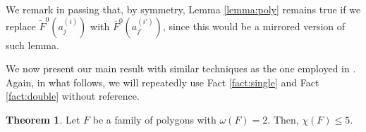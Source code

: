\documentclass[12pt]{article}
\theoremstyle{definition}
\newtheorem{thm}{Theorem}
\begin{document}
     We remark in passing that, by symmetry,
     Lemma \ref{lemma:poly} remains 
     true if we
     replace $\widetilde{F}^{0}\left(a_{j}^{\left(i\right)}\right)$ 
     with $\overline{F}^{0}\left(a_{j'}^{\left(i'\right)}\right)$,
     since this would be a mirrored version
     of such lemma.
      
     We now present our main result
     with similar techniques as the one
     employed in \cite{rus}.
     Again, in what follows, 
     we will repeatedly use
     Fact \ref{fact:single}
     and Fact \ref{fact:double}
     without reference.

     \begin{thm}
         Let $F$ be a family of
         polygons with $\omega\left(F\right) = 2$.
         Then, $\chi\left(F\right) \leq 5$.
     \end{thm}
\end{document}
